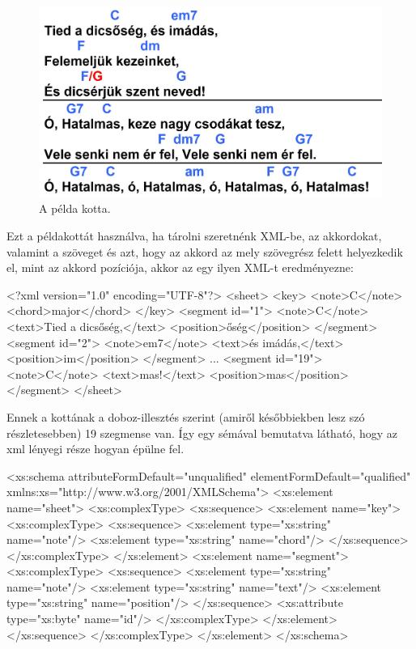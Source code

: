 \begin{figure}[h]
	\includegraphics[width=\textwidth]{images/samples/Tied_a_dicsoseg.jpg}
	\caption{A példa kotta.}
	\label{fig:song1}
\end{figure}

Ezt a példakottát használva, ha tárolni szeretnénk XML-be, az akkordokat, valamint a szöveget és azt, hogy az akkord az mely szövegrész felett helyezkedik el, mint az akkord pozíciója, akkor az egy ilyen XML-t eredményezne:
\begin{xml}
<?xml version="1.0" encoding="UTF-8"?>
<sheet>
   <key>
      <note>C</note>
      <chord>major</chord>
   </key>
   <segment id="1">
      <note>C</note>
      <text>Tied a dicsőség,</text>
      <position>őség</position>
   </segment>
   <segment id="2">
      <note>em7</note>
      <text>és imádás,\n</text>
      <position>im</position>
   </segment>
   ...
   <segment id="19">
      <note>C</note>
      <text>mas!</text>
      <position>mas</position>
   </segment>
</sheet>
\end{xml}

Ennek a kottának a doboz-illesztés szerint (amiről későbbiekben lesz szó részletesebben) 19 szegmense van. Így egy sémával bemutatva látható, hogy az xml lényegi része hogyan épülne fel.
\begin{xml}
<xs:schema attributeFormDefault="unqualified" elementFormDefault="qualified" xmlns:xs="http://www.w3.org/2001/XMLSchema">
  <xs:element name="sheet">
    <xs:complexType>
      <xs:sequence>
        <xs:element name="key">
          <xs:complexType>
            <xs:sequence>
              <xs:element type="xs:string" name="note"/>
              <xs:element type="xs:string" name="chord"/>
            </xs:sequence>
          </xs:complexType>
        </xs:element>
        <xs:element name="segment">
          <xs:complexType>
            <xs:sequence>
              <xs:element type="xs:string" name="note"/>
              <xs:element type="xs:string" name="text"/>
              <xs:element type="xs:string" name="position"/>
            </xs:sequence>
            <xs:attribute type="xs:byte" name="id"/>
          </xs:complexType>
        </xs:element>
      </xs:sequence>
    </xs:complexType>
  </xs:element>
</xs:schema>
\end{xml}

